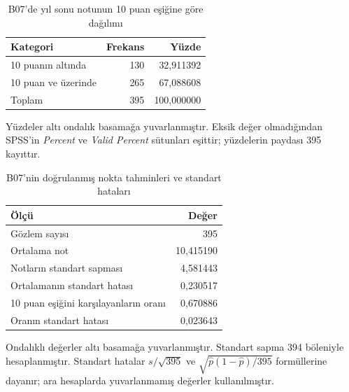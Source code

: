 \begin{table}[H]
\centering
\caption{B07'de yıl sonu notunun 10 puan eşiğine göre dağılımı}
\label{tab:b07-dogrulanmis-frekans}
\begin{tabular}{@{}lrr@{}}
\toprule
Kategori & Frekans & Yüzde \\
\midrule
10 puanın altında & 130 & 32,911392 \\
10 puan ve üzerinde & 265 & 67,088608 \\
Toplam & 395 & 100,000000 \\
\bottomrule
\end{tabular}
\par\smallskip
{\footnotesize Yüzdeler altı ondalık basamağa yuvarlanmıştır.
Eksik değer olmadığından SPSS'in \emph{Percent} ve \emph{Valid Percent}
sütunları eşittir; yüzdelerin paydası 395 kayıttır.\par}
\end{table}

\begin{table}[H]
\centering
\caption{B07'nin doğrulanmış nokta tahminleri ve standart hataları}
\label{tab:b07-dogrulanmis-tahmin}
\begin{tabular}{@{}lr@{}}
\toprule
Ölçü & Değer \\
\midrule
Gözlem sayısı & 395 \\
Ortalama not & 10,415190 \\
Notların standart sapması & 4,581443 \\
Ortalamanın standart hatası & 0,230517 \\
10 puan eşiğini karşılayanların oranı & 0,670886 \\
Oranın standart hatası & 0,023643 \\
\bottomrule
\end{tabular}
\par\smallskip
{\footnotesize Ondalıklı değerler altı basamağa yuvarlanmıştır.
Standart sapma 394 böleniyle hesaplanmıştır. Standart hatalar
$s/\sqrt{395}$ ve $\sqrt{\hat p(1-\hat p)/395}$ formüllerine dayanır;
ara hesaplarda yuvarlanmamış değerler kullanılmıştır.\par}
\end{table}


